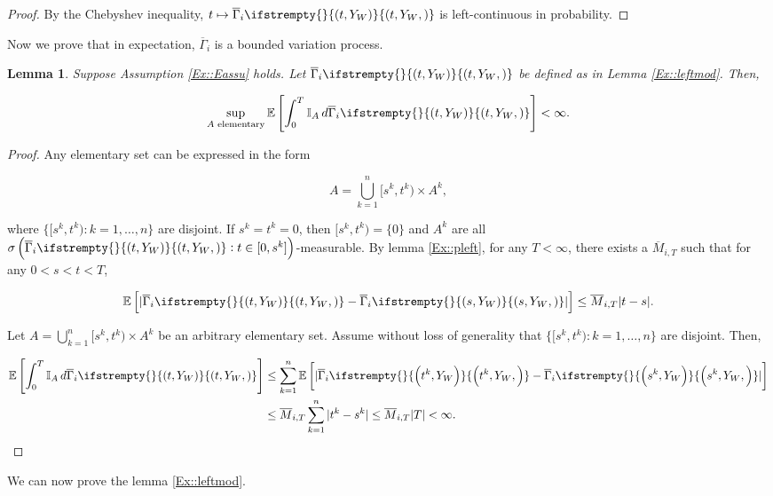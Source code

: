\documentclass[12pt]{article}
\newcommand{\mb}{\mathbb}
\newcommand{\ov}{\overline}
\newcommand{\te}{\text}
\newcommand{\ex}[1]{\mb{E}\left[#1\right]}			%
\newcommand{\indx}[1]{^{#1}}						%
\newcommand{\vind}[1]{_{#1}}						%
\newcommand{\stpara}[1]{_{#1}}						%
\newcommand{\tmepro}[3]{
\ifstrempty{#3}{
	\left(#1,#2\right)}{
	\left(#1,#2,#3\right)}}							%
\newcommand{\Xg}{Y}									%
\newcommand{\ratee}{\Gamma}							%
\newcommand{\grate}{\ov{\ratee}}					%
\newcommand{\const}{M}								%
\newcommand{\sttpara}[2]{_{#1,#2}}					%
\newcommand{\typset}{A}							%
\newtheorem{lem}[thms]{Lemma}
\begin{document}
\begin{proof}
By the Chebyshev inequality, \(t \mapsto \grate\stpara{i}\tmepro{t}{\Xg\vind{W}}{}\) is left-continuous in probability.
\end{proof}

Now we prove that in expectation, \(\grate\stpara{i}\) is a bounded variation process.

\begin{lem}
Suppose Assumption \ref{Ex::Eassu} holds. Let \(\grate\stpara{i}\tmepro{t}{\Xg\vind{W}}{}\) be defined as in Lemma \ref{Ex::leftmod}. Then, 

\[\sup_{\typset\te{ elementary}} \ex{\int_0^T \mb{I}_\typset\,d\grate\stpara{i}\tmepro{t}{\Xg\vind{W}}{}} < \infty.\]
\label{Ex::bddvar}
\end{lem}

\begin{proof}
Any elementary set can be expressed in the form

\[\typset = \bigcup_{k = 1}^n [s\indx{k},t\indx{k})\times \typset\indx{k},\]

where \(\{[s\indx{k},t\indx{k}):k=1,\dots,n\}\) are disjoint. If \(s\indx{k} = t\indx{k} = 0\), then \([s\indx{k},t\indx{k}) = \{0\}\) and \(\typset\indx{k}\) are all \(\sigma\left(\grate\stpara{i}\tmepro{t}{\Xg\vind{W}}{}:t\in [0,s\indx{k}]\right)\)-measurable. By lemma \ref{Ex::pleft}, for any \(T < \infty\), there exists a \(\ov{\const}\sttpara{i}{T}\) such that for any \(0 < s < t < T\),

\[\ex{|\grate\stpara{i}\tmepro{t}{\Xg\vind{W}}{} - \grate\stpara{i}\tmepro{s}{\Xg\vind{W}}{}|} \leq \ov{\const}\sttpara{i}{T}|t-s|.\]

Let \(\typset = \bigcup_{k = 1}^n [s\indx{k},t\indx{k})\times \typset\indx{k}\) be an arbitrary elementary set. Assume without loss of generality that \(\{[s\indx{k},t\indx{k}):k = 1,\dots,n\}\) are disjoint. Then,

\begin{align*}
\ex{\int_0^T \mb{I}_A\,d\grate\stpara{i}\tmepro{t}{\Xg\vind{W}}{}} &\leq \sum_{k=1}^n \ex{|\grate\stpara{i}\tmepro{t\indx{k}}{\Xg\vind{W}}{} - \grate\stpara{i}\tmepro{s\indx{k}}{\Xg\vind{W}}{}|}\\
&\leq \ov{\const}\sttpara{i}{T}\sum_{k=1}^n |t\indx{k} - s\indx{k}| \leq \ov{\const}\sttpara{i}{T}|T| < \infty.
\end{align*} 
\end{proof}

We can now prove the lemma \ref{Ex::leftmod}.
\end{document}
